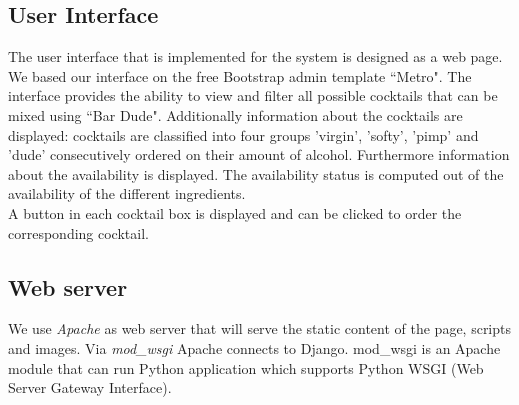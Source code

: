 \documentclass{acm_proc_article-sp}
\begin{document}
\begin{minipage}{\linewidth}%
\label{fig:rasp_arduino}%
\end{minipage}
 
\subsection{User Interface}
The user interface that is implemented for the system is designed as a web page. We based our interface on the free Bootstrap admin template ``Metro". The interface provides the ability to view and filter all possible cocktails that can be mixed using ``Bar Dude". Additionally information about the cocktails are displayed: cocktails are classified into four groups 'virgin', 'softy', 'pimp' and 'dude' consecutively ordered on their amount of alcohol. Furthermore information about the availability is displayed. The availability status is computed out of the availability of the different ingredients. \\
A button in each cocktail box is displayed and can be clicked to order the corresponding cocktail.

\subsection{Web server}\label{sec:web server}
We use \textit{Apache} as web server that will serve the static content of the page, scripts and images. Via \textit{mod\_wsgi} Apache connects to Django. mod\_wsgi is an Apache module that can run Python application which supports Python WSGI (Web Server Gateway Interface).
\end{document}

